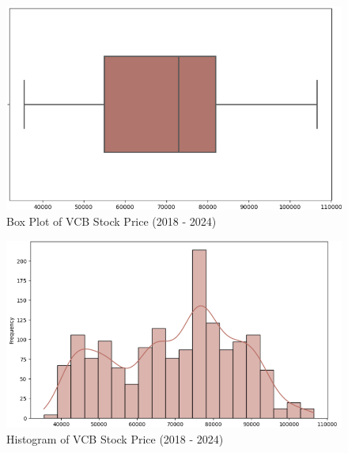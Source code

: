 \documentclass[conference]{IEEEtran}
\begin{document}
\begin{figure}[H]
  \centering
  \begin{minipage}{0.8\linewidth}
    \centering
        \includegraphics[width=\linewidth]{images/vcb_boxplot.png}
    \caption{Box Plot of VCB Stock Price (2018 - 2024)}
    \label{fig3}
  \end{minipage}
\end{figure}

\begin{figure}[H]
    \centering
    \begin{minipage}{0.8\linewidth}
    \centering
        \includegraphics[width=\linewidth]{images/vcb_histogram.png}
    \caption{Histogram of VCB Stock Price (2018 - 2024)}
    \label{fig4}
    \end{minipage}
\end{figure}
\end{document}
